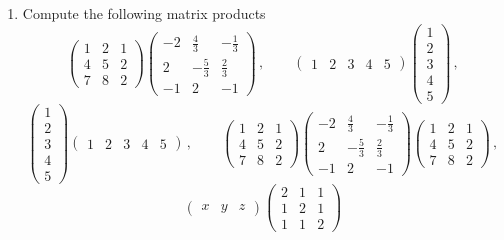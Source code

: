 


\begin{enumerate}

\item 
Compute the following matrix products
$$
\begin{pmatrix}1&2&1\\[1mm]4&5&2\\[1mm]7&8&2\end{pmatrix}
\begin{pmatrix}-2&\frac43&-\frac{1}{3}\\[1mm]2&-\frac53&\frac23\\[1mm]-1&2&-1\end{pmatrix}\, ,
\qquad
\begin{pmatrix}1&2&3&4&5\end{pmatrix}
\begin{pmatrix}1\\[1mm]2\\[1mm]3\\[1mm]4\\[1mm]5\end{pmatrix}\, ,
$$
$$
\begin{pmatrix}1\\[1mm]2\\[1mm]3\\[1mm]4\\[1mm]5\end{pmatrix}\begin{pmatrix}1&2&3&4&5\end{pmatrix}\, ,\qquad
\begin{pmatrix}1&2&1\\[1mm]4&5&2\\[1mm]7&8&2\end{pmatrix}
\begin{pmatrix}-2&\frac43&-\frac{1}{3}\\[1mm]2&-\frac53&\frac23\\[1mm]-1&2&-1\end{pmatrix}
\begin{pmatrix}1&2&1\\[1mm]4&5&2\\[1mm]7&8&2\end{pmatrix}\, ,
$$
$$
\begin{pmatrix}x & y &z\end{pmatrix}
\begin{pmatrix}
2& 1& 1 \\ 1 & 2 & 1 \\ 1 & 1 & 2
\end{pmatrix}
$$
\end{enumerate}
